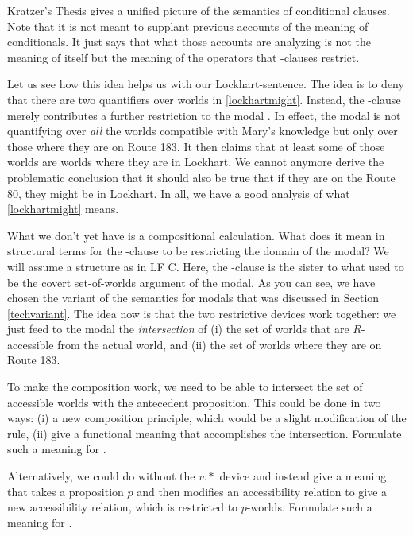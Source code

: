 Kratzer's Thesis gives a unified picture of the semantics of conditional clauses. Note that it is not meant to supplant previous accounts of the meaning of conditionals. It just says that what those accounts are analyzing is not the meaning of  itself but the meaning of the operators that -clauses restrict. 

Let us see how this idea helps us with our Lockhart-sentence. The idea is to deny that there are two quantifiers over worlds in \ref{lockhartmight}. Instead, the -clause merely contributes a further restriction to the modal . In effect, the modal is not quantifying over \emph{all} the worlds compatible with Mary's knowledge but only over those where they are on Route 183. It then claims that at least some of those worlds are worlds where they are in Lockhart. We cannot anymore derive the problematic conclusion that it should also be true that if they are on the Route 80, they might be in Lockhart. In all, we have a good analysis of what \ref{lockhartmight} means.

What 
%
%
we don't yet have is a compositional calculation. What does it mean in structural terms for the -clause to be restricting the domain of the modal? We will assume a structure as in LF C. Here, the -clause is the sister to what used to be the covert set-of-worlds argument of the modal. As you can see, we have chosen the variant of the semantics for modals that was discussed in Section \ref{techvariant}. The idea now is that the two restrictive devices work together: we just feed to the modal the \emph{intersection} of (i) the set of worlds that are $R$-accessible from the actual world, and (ii) the set of worlds where they are on Route 183.

\begin{exercise}
	
	To make the composition work, we need to be able to intersect the set of accessible worlds with the antecedent proposition. This could be done in two ways: (i) a new composition principle, which would be a slight modification of the  rule, (ii) give  a functional meaning that accomplishes the intersection. Formulate such a meaning for .
	
	Alternatively, we could do without the $w*$ device and instead give  a meaning that takes a proposition $p$ and then modifies an accessibility relation to give a new accessibility relation, which is restricted to $p$-worlds. Formulate such a meaning for . \eex
\end{exercise}

